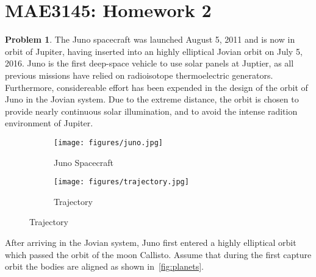 \documentclass[10pt]{article}
\date{}
\theoremstyle{definition}
\newtheorem{prob}{Problem}[section]
\begin{document}
\pagestyle{empty}
\section*{MAE3145: Homework 2}
\vspace*{-0.4cm}

\begin{prob}
    The Juno spacecraft was launched August 5, 2011 and is now in orbit of Jupiter, having inserted into an highly elliptical Jovian orbit on July 5, 2016.
    Juno is the first deep-space vehicle to use solar panels at Juptier, as all previous missions have relied on radioisotope thermoelectric generators. 
    Furthermore, considereable effort has been expended in the design of the orbit of Juno in the Jovian system. 
    Due to the extreme distance, the orbit is chosen to provide nearly continuous solar illumination, and to avoid the intense radition environment of Jupiter.
    \begin{figure}[htbp]
        \centering
        \begin{subfigure}[htbp]{0.5\textwidth} 
            \texttt{[image: figures/juno.jpg]} 
            \caption{Juno Spacecraft \label{fig:juno}} 
        \end{subfigure}\hfill
        \begin{subfigure}[htbp]{0.5\textwidth} 
            \texttt{[image: figures/trajectory.jpg]} 
            \caption{Trajectory \label{fig:trajectory<`4`>}} 
        \end{subfigure} 
    \end{figure}
        
    After arriving in the Jovian system, Juno first entered a highly elliptical orbit which passed the orbit of the moon Callisto.
    Assume that during the first capture orbit the bodies are aligned as shown in~\cref{fig:planets}.
    \begin{figure}[htbp]
        \centering
\end{figure}
\end{prob}
\end{document}
